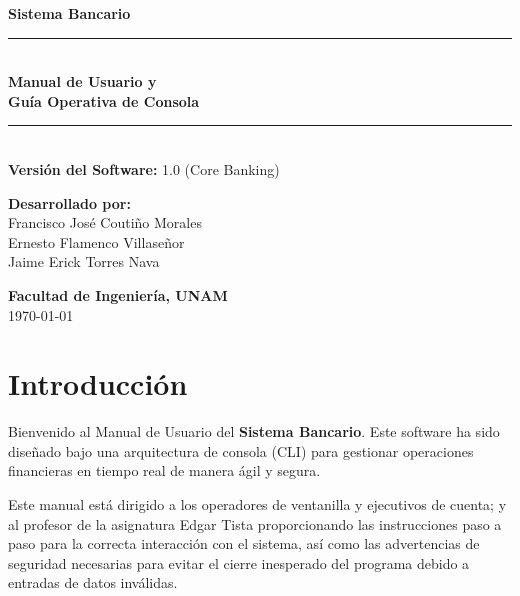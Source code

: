 \documentclass[12pt, letterpaper]{article}
\begin{document}
	
	\begin{titlepage}
		\centering
		\vspace*{1cm}
		
		{\Huge \textbf{Sistema Bancario}}\\[1.5cm]
		
		\rule{\linewidth}{0.5mm} \\[0.5cm]
		{ \huge \bfseries Manual de Usuario y \\ Guía Operativa de Consola }\\[0.4cm]
		\rule{\linewidth}{0.5mm} \\[2cm]
		
		{\Large \textbf{Versión del Software:} 1.0 (Core Banking)}\\[1cm]
		
		\begin{flushleft}
			\large \textbf{Desarrollado por:}\\
			Francisco José Coutiño Morales\\
			Ernesto Flamenco Villaseñor\\
			Jaime Erick Torres Nava
		\end{flushleft}
		
		\vfill
		
		{\large \textbf{Facultad de Ingeniería, UNAM}}\\[0.2cm]
		{\normalsize \today}
	\end{titlepage}
	
	\newpage
	\tableofcontents
	\newpage
	
	\section{Introducción}
	Bienvenido al Manual de Usuario del \textbf{Sistema Bancario}. Este software ha sido diseñado bajo una arquitectura de consola (CLI) para gestionar operaciones financieras en tiempo real de manera ágil y segura. 
	
	Este manual está dirigido a los operadores de ventanilla y ejecutivos de cuenta; y al profesor de la asignatura Edgar Tista proporcionando las instrucciones paso a paso para la correcta interacción con el sistema, así como las advertencias de seguridad necesarias para evitar el cierre inesperado del programa debido a entradas de datos inválidas.
	
\end{document}
